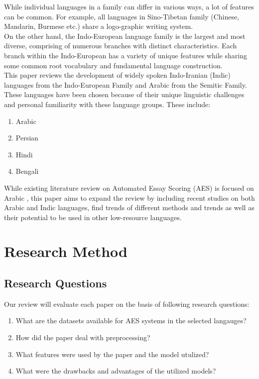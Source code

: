 \documentclass{article}
\begin{document}
While individual languages in a family can differ in various ways, a lot of features can be common. For example, all languages in Sino-Tibetan family (Chinese, Mandarin, Burmese etc.) share a logo-graphic writing system. \\
On the other hand, the Indo-European language family is the largest and most diverse, comprising of numerous branches with distinct characteristics. Each branch within the Indo-European has a variety of unique features while sharing some common root vocabulary and fundamental language construction.\\

This paper reviews the development of widely spoken Indo-Iranian (Indic) languages from the Indo-European Family and Arabic from the Semitic Family. These languages have been chosen because of their unique linguistic challenges and personal familiarity with these language groups.
These include:
\begin{enumerate}
    \item Arabic
    \item Persian
    \item Hindi
    \item Bengali
\end{enumerate}
While existing literature review on Automated Essay Scoring (AES) is focused on Arabic \cite{litreviewarabic}, this paper aims to expand the review by including recent studies on both Arabic and Indic languages, find trends of different methods and trends as well as their potential to be used in other low-resource languages.
\newpage
\section{Research Method}
\subsection{Research Questions}
Our review will evaluate each paper on the basis of following research questions:
\begin{enumerate}[label=\textbf{RQ\arabic*}, leftmargin=1.5cm]
    \item What are the datasets available for AES systems in the selected langauges?
    \item How did the paper deal with preprocessing?
    \item What features were used by the paper and the model utulized?
    \item What were the drawbacks and advantages of the utilized models?
\end{enumerate}
\end{document}
